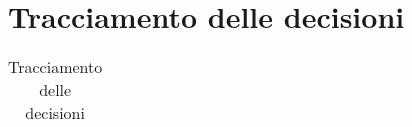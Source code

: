 
\section{Tracciamento delle decisioni}

\begin{longtable}{|C{.40\textwidth}|C{.60\textwidth}|}

\caption{Tracciamento delle decisioni}
\end{longtable}

